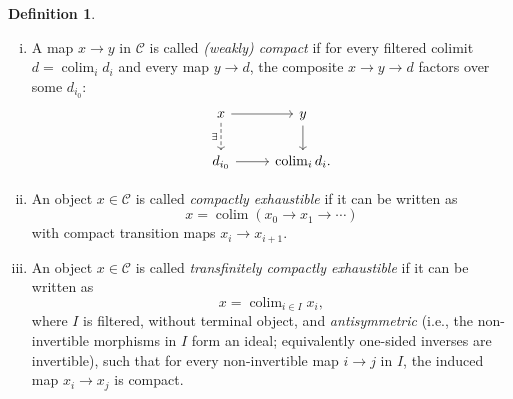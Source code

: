 \documentclass[draft]{amsart}
\newcommand{\cat}[1]{\mathcal{#1}}
\DeclareMathOperator*{\colim}{colim}
\theoremstyle{definition}
\newtheorem{defn}[thm]{Definition}
\begin{document}
\begin{defn}
\begin{enumerate}[(i)]
\item A map $x\to y$ in $\cat C$ is called \emph{(weakly) compact} if for every filtered colimit $d = \colim_i d_i$ and every map $y\to d$, the composite $x\to y\to d$ factors over some $d_{i_0}$:
\[
\begin{tikzcd}
x \ar[d,dashed,"\exists"'] \ar[r] & y \ar[d] \\
d_{i_0} \ar[r] & \colim_i d_i.
\end{tikzcd}
\]

\item An object $x \in \cat C$ is called \emph{compactly exhaustible} if it can be written as
\[
x = \colim (x_0\to x_1\to \dotsb)
\]
with compact transition maps $x_i\to x_{i+1}$.

\item An object $x\in \cat C$ is called \emph{transfinitely compactly exhaustible} if it can be written as
\[
x = \colim_{i\in I} x_i,
\]
where $I$ is filtered, without terminal object, and \emph{antisymmetric} (i.e., the non-invertible morphisms in $I$ form an ideal; equivalently one-sided inverses are invertible), such that for every non-invertible map $i\to j$ in $I$, the induced map $x_i\to x_j$ is compact.
\end{enumerate}
\end{defn}
\end{document}
